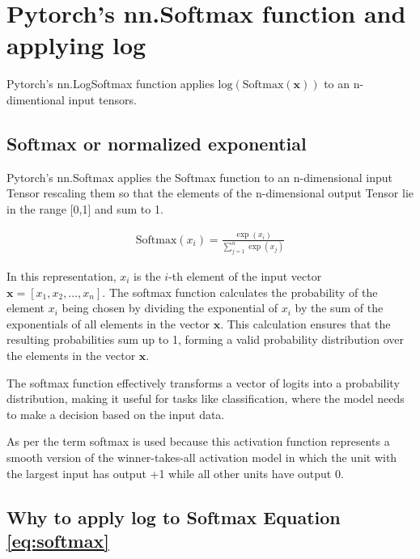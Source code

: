 \section{Pytorch's nn.Softmax function and applying log }

Pytorch's nn.LogSoftmax function applies $\text{log}\left(\text{Softmax}(\mathbf{x})\right)$ to an n-dimentional input tensors. \\



\subsection{Softmax or normalized exponential \parencite{Book-Bishop-Neural}} \label{sec:softmax}

Pytorch's nn.Softmax applies the Softmax function to an n-dimensional input Tensor rescaling them so that the elements of the n-dimensional output Tensor lie in the range [0,1] and sum to 1.




\begin{align}
    \text{Softmax}(x_i) = \frac{{\exp(x_i)}}{{\sum_{j=1}^n \exp(x_j)}} \label{eq:softmax}
\end{align}


In this representation, \(x_i\) is the \(i\)-th element of the input vector \(\mathbf{x} = [x_1, x_2, \ldots, x_n]\). The softmax function calculates the probability of the element \(x_i\) being chosen by dividing the exponential of \(x_i\) by the sum of the exponentials of all elements in the vector \(\mathbf{x}\). This calculation ensures that the resulting probabilities sum up to 1, forming a valid probability distribution over the elements in the vector \(\mathbf{x}\).

The softmax function effectively transforms a vector of logits into a probability distribution, making it useful for tasks like classification, where the model needs to make a decision based on the input data.

As per \parencite{Book-Bishop-Neural} the term softmax is used because this activation function represents a smooth version of the winner-takes-all activation model in which the unit with the largest input has output +1 while all other units have output 0.

\clearpage

\subsection{Why to apply log to Softmax Equation \eqref{eq:softmax} } \label{sec:Logsoft}

